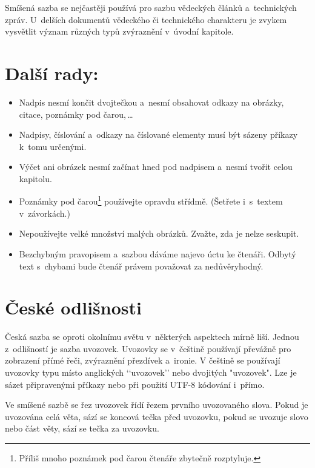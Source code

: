 \documentclass[twocolumn, 10pt, a4paper]{article}
\begin{document}
Smíšená sazba se nejčastěji používá pro sazbu vědeckých článků a~technických zpráv. U~delších dokumentů vědeckého či technického charakteru je zvykem vysvětlit význam různých typů zvýraznění v~úvodní kapitole.

\section{Další rady:} \label{3}

\begin{itemize}
\item Nadpis nesmí končit dvojtečkou a~nesmí obsahovat odkazy na obrázky, citace, poznámky pod čarou,\,\dots

\item Nadpisy, číslování a~odkazy na číslované elementy musí být sázeny příkazy k~tomu určenými.

\item Výčet ani obrázek nesmí začínat hned pod nadpisem a~nesmí tvořit celou kapitolu.

\item Poznámky pod čarou\footnote{Příliš mnoho poznámek pod čarou čtenáře zbytečně rozptyluje.} používejte opravdu střídmě. (Šetřete i~s~textem v~závorkách.)

\item Nepoužívejte velké množství malých obrázků. Zvažte, zda je nelze seskupit.

\item Bezchybným pravopisem a~sazbou dáváme najevo úctu ke čtenáři. Odbytý text s~chybami bude čtenář právem považovat za nedůvěryhodný.
\end{itemize}

\section{České odlišnosti}

Česká sazba se oproti okolnímu světu v~některých aspektech mírně liší. Jednou z~odlišností je sazba uvozovek. Uvozovky se v~češtině používají převážně pro zobrazení přímé řeči, zvýraznění přezdívek a~ironie. V češtině se používají uvozovky typu  místo anglických ‘‘uvozovek’’ nebo dvojitých "uvozovek". Lze je sázet připravenými příkazy nebo při použití UTF-8 kódování i~přímo.

Ve smíšené sazbě se řez uvozovek řídí řezem prvního uvozovaného slova. Pokud je uvozována celá věta, sází se koncová tečka před uvozovku, pokud se uvozuje slovo nebo část věty, sází se tečka za uvozovku.
\end{document}
